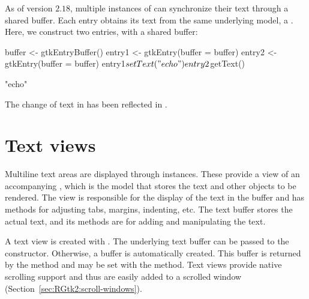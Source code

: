 As of \GTK\/ version $2.18$, multiple instances of 
can synchronize their text through a shared buffer. Each entry obtains
its text from the same underlying model, a
. Here, we construct two entries, with a shared
buffer:
\begin{Schunk}
\begin{Sinput}
 buffer <- gtkEntryBuffer()        
 entry1 <- gtkEntry(buffer = buffer)
 entry2 <- gtkEntry(buffer = buffer)
 entry1$setText("echo")
 entry2$getText()
\end{Sinput}
\begin{Soutput}
[1] "echo"
\end{Soutput}
\end{Schunk}
%
The change of text in  has been reflected in
.

\section{Text views} %
\label{sec:RGtk2:textviews}

Multiline text areas are displayed through 
instances. These provide a view of an accompanying
, which is the model that stores the text and
other objects to be rendered. The view is responsible for the display
of the text in the buffer and has methods for adjusting tabs, margins,
indenting, etc. The text buffer stores the actual text, and its
methods are for adding and manipulating the text.

A text view is created with .  The underlying
text buffer can be passed to the constructor. Otherwise, a buffer is
automatically created.  This buffer is returned by the method
 and may be set with the
 method. Text views provide native
scrolling support and thus are easily added to a scrolled window
(Section~\ref{sec:RGtk2:scroll-windows}). 

